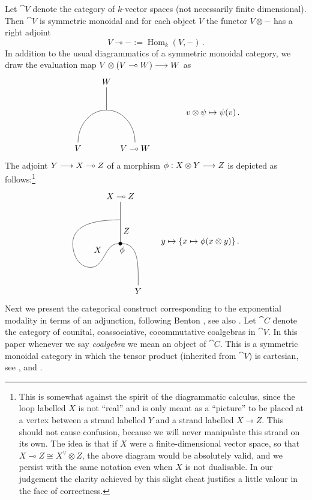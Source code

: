 \documentclass[english,letter paper,12pt,reqno]{article}
\def\mapnode{\node[circle,draw=black,fill=black,inner sep=0.5mm]}
\theoremstyle{example}
\numberwithin{equation}{section}
\def\Hom{\operatorname{Hom}}
\begin{document}
Let $\cat{V}$ denote the category of $k$-vector spaces (not necessarily finite dimensional). Then $\cat{V}$ is symmetric monoidal and for each object $V$ the functor $V \otimes -$ has a right adjoint
\[
V \multimap - := \Hom_k(V, -)\,.
\]
In addition to the usual diagrammatics of a symmetric monoidal category, we draw the evaluation map $V \otimes (V \multimap W) \longrightarrow W$ as
\begin{equation}\label{eq:diagram_eval_map}
\begin{tikzpicture}[scale=0.4,auto,baseline=(current  bounding  box.center)]
\node (topr) at (0,3) {$W$};
\coordinate (o) at (0,0) {};
\node (bottoml) at (-3,-4) {$V$};
\node (bottomr) at (3,-4) {$V \multimap W$};
\draw[out=90,in=180] (bottoml) to (o);
\draw[out=90,in=0] (bottomr) to (o);
\draw (o) to (topr);
\end{tikzpicture}
\qquad\qquad
v \otimes \psi \mapsto \psi(v)\,.
\end{equation}
The adjoint $Y \longrightarrow X \multimap Z$ of a morphism $\phi: X \otimes Y \longrightarrow Z$ is depicted as follows:\footnote{This is somewhat against the spirit of the diagrammatic calculus, since the loop labelled $X$ is not ``real'' and is only meant as a ``picture'' to be placed at a vertex between a strand labelled $Y$ and a strand labelled $X \multimap Z$. This should not cause confusion, because we will never manipulate this strand on its own. The idea is that if $X$ were a finite-dimensional vector space, so that $X \multimap Z \cong X^{\vee} \otimes Z$, the above diagram would be absolutely valid, and we persist with the same notation even when $X$ is not dualisable. In our judgement the clarity achieved by this slight cheat justifies a little valour in the face of correctness.}
\begin{equation}\label{eq:diagram_adjoint_of_map}
\begin{tikzpicture}[scale=0.5,auto,baseline=(current  bounding  box.center)]
\node (topr) at (1,4) {$X \multimap Z$};
\mapnode (o) at (1,0) {};
\node [below] at (o.east) {$\phi$};
\node (gamma) at (2.5,-4) {$Y$};
\draw[out=90,in=0] (gamma) to (o);
\draw[out=0,in=180] (-1.5,-2) to node {$X$} (o);
\draw[out=180,in=270] (-1.5,-2) to (-3,0);
\draw[out=90,in=180] (-3,0) to (1,2);
\draw (o) to node [swap] {$Z$} (1,2);
\draw (1,2) to (topr);
\end{tikzpicture}
\qquad
y \mapsto \{ x \mapsto \phi( x \otimes y ) \}\,.
\end{equation}
Next we present the categorical construct corresponding to the exponential modality in terms of an adjunction, following Benton \cite{benton}, see also \cite[\S 7]{mellies}. Let $\cat{C}$ denote the category of counital, coassociative, cocommutative coalgebras in $\cat{V}$. In this paper whenever we say \emph{coalgebra} we mean an object of $\cat{C}$. This is a symmetric monoidal category in which the tensor product (inherited from $\cat{V}$) is cartesian, see \cite[Theorem 6.4.5]{sweedler}, \cite{barr} and \cite[\S 6.5]{mellies}. 
\end{document}
